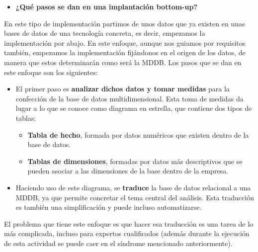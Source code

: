 \documentclass[paper=a4, fontsize=11pt]{scrartcl} %
\begin{document}
\begin{itemize}
\item \textbf{¿Qué pasos se dan en una implantación bottom-up?}
\end{itemize}
En este tipo de implementación partimos de unos datos que ya existen en unas bases de datos de una tecnología concreta, es decir, empezamos la implementación por abajo. En este enfoque, aunque nos guiamos por requisitos también, empezamos la implementación fijándonos en el origen de los datos, de manera que estos determinarán como será la MDDB. Los pasos que se dan en este enfoque son los siguientes:
\begin{itemize}
	\item El primer paso es \textbf{analizar dichos datos y tomar medidas} para la confección de la base de datos multidimensional. Esta toma de medidas da lugar a lo que se conoce como diagrama en estrella, que contiene dos tipos de tablas:
	\begin{itemize}
	\item \textbf{Tabla de hecho}, formada por datos numéricos que existen dentro de la base de datos.
	\item \textbf{Tablas de dimensiones}, formadas por datos más descriptivos que se pueden asociar a las dimensiones de la base dentro de la empresa.
	\end{itemize}
	\item Haciendo uso de este diagrama, se \textbf{traduce} la base de datos relacional a una MDDB, ya que permite concretar el tema central del análisis. Esta traducción es también una simplificación y puede incluso automatizarse. 
\end{itemize}	
El problema que tiene este enfoque es que hacer esa traducción es una tarea de lo más complicada, incluso para expertos cualificados (además durante la ejecución de esta actividad se puede caer en el síndrome mencionado anteriormente). 
\end{document}
